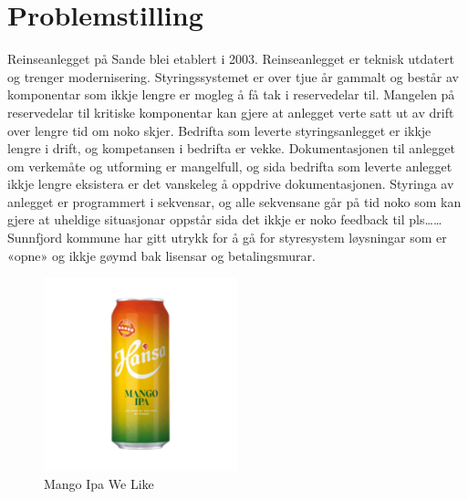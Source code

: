 \section{Problemstilling}
Reinseanlegget på Sande blei etablert i 2003. Reinseanlegget er teknisk utdatert og trenger modernisering. 
Styringssystemet er over tjue år gammalt og består av komponentar som ikkje lengre er mogleg å få tak i reservedelar til. 
Mangelen på reservedelar til kritiske komponentar kan gjere at anlegget verte satt ut av drift over lengre tid om noko skjer. 
Bedrifta som leverte styringsanlegget er ikkje lengre i drift, og kompetansen i bedrifta er vekke. 
Dokumentasjonen til anlegget om verkemåte og utforming er mangelfull, og sida bedrifta som leverte anlegget ikkje lengre eksistera er det vanskeleg å oppdrive dokumentasjonen.
Styringa av anlegget er programmert i sekvensar, og alle sekvensane går på tid noko som kan gjere at uheldige situasjonar oppstår sida det ikkje er noko feedback til pls……
Sunnfjord kommune har gitt utrykk for å gå for styresystem løysningar som er «opne» og ikkje gøymd bak lisensar og betalingsmurar.


\begin{figure}[htbp]
    \centering
    \includegraphics[width=0.5\textwidth]{Bilder/mango.jpg}
    \caption{Mango Ipa We Like}\label{fig:Mango-Logo}
\end{figure}
    